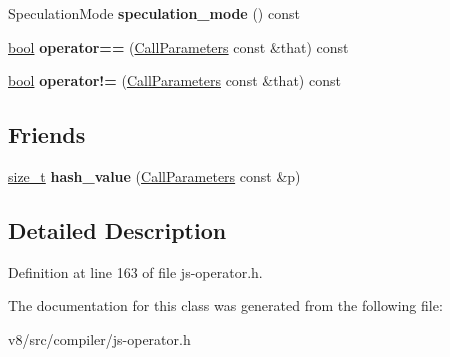 \begin{DoxyCompactItemize}
\item 
\mbox{\label{classv8_1_1internal_1_1compiler_1_1CallParameters_af62b94180f1ab1c2207cf09064db04fa}} 
Speculation\+Mode {\bfseries speculation\+\_\+mode} () const
\item 
\mbox{\label{classv8_1_1internal_1_1compiler_1_1CallParameters_a333686b5e6ba355370e35784a9c09de3}} 
\mbox{\hyperlink{classbool}{bool}} {\bfseries operator==} (\mbox{\hyperlink{classv8_1_1internal_1_1compiler_1_1CallParameters}{Call\+Parameters}} const \&that) const
\item 
\mbox{\label{classv8_1_1internal_1_1compiler_1_1CallParameters_a32c7e227077346b72c9c5b4209cce22d}} 
\mbox{\hyperlink{classbool}{bool}} {\bfseries operator!=} (\mbox{\hyperlink{classv8_1_1internal_1_1compiler_1_1CallParameters}{Call\+Parameters}} const \&that) const
\end{DoxyCompactItemize}
\subsection*{Friends}
\begin{DoxyCompactItemize}
\item 
\mbox{\label{classv8_1_1internal_1_1compiler_1_1CallParameters_a6abae0992df6e5a0e076c11707c23ef9}} 
\mbox{\hyperlink{classsize__t}{size\+\_\+t}} {\bfseries hash\+\_\+value} (\mbox{\hyperlink{classv8_1_1internal_1_1compiler_1_1CallParameters}{Call\+Parameters}} const \&p)
\end{DoxyCompactItemize}


\subsection{Detailed Description}


Definition at line 163 of file js-\/operator.\+h.



The documentation for this class was generated from the following file\+:\begin{DoxyCompactItemize}
\item 
v8/src/compiler/js-\/operator.\+h\end{DoxyCompactItemize}
